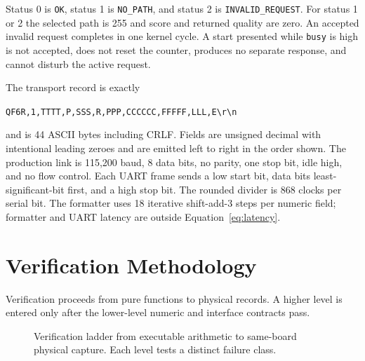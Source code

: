 Status 0 is \texttt{OK}, status 1 is \texttt{NO\_PATH}, and status 2 is
\texttt{INVALID\_REQUEST}. For status 1 or 2 the selected path is 255 and score and
returned quality are zero. An accepted invalid request completes in one kernel
cycle. A start presented while \texttt{busy} is high is not accepted, does not reset
the counter, produces no separate response, and cannot disturb the active request.

The transport record is exactly
\begin{center}
\texttt{QF6R,1,TTTT,P,SSS,R,PPP,CCCCCC,FFFFF,LLL,E\textbackslash r\textbackslash n}
\end{center}
and is 44 ASCII bytes including CRLF. Fields are unsigned decimal with intentional
leading zeroes and are emitted left to right in the order shown. The production
link is 115,200 baud, 8 data bits, no parity, one stop bit, idle high, and no flow
control. Each UART frame sends a low start bit, data bits least-significant-bit
first, and a high stop bit. The rounded divider is 868 clocks per serial bit. The
formatter uses 18 iterative shift-add-3 steps per numeric field; formatter and UART
latency are outside Equation~\eqref{eq:latency}.

\section{Verification Methodology}

Verification proceeds from pure functions to physical records. A higher level is
entered only after the lower-level numeric and interface contracts pass.

\begin{figure}[H]
\centering
{}
\caption{Verification ladder from executable arithmetic to same-board physical
capture. Each level tests a distinct failure class.}
\label{fig:verification-ladder}
\end{figure}

